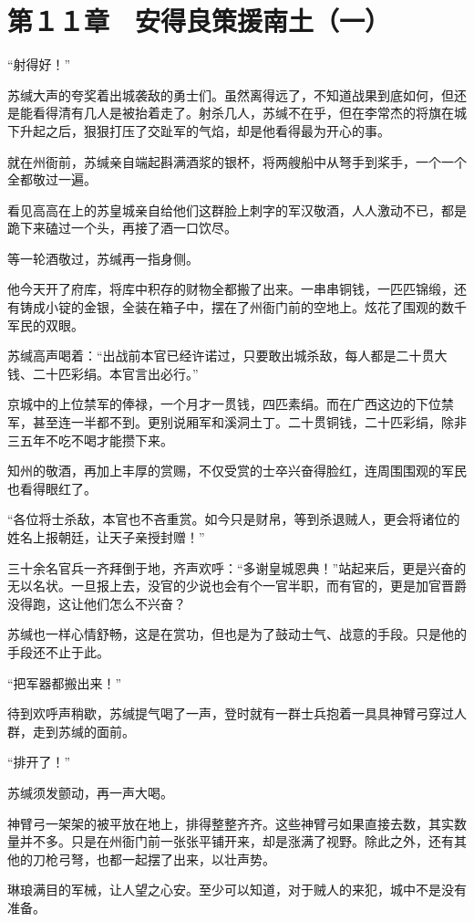 \section{第１１章　安得良策援南土（一）}

“射得好！”

苏缄大声的夸奖着出城袭敌的勇士们。虽然离得远了，不知道战果到底如何，但还是能看得清有几人是被抬着走了。射杀几人，苏缄不在乎，但在李常杰的将旗在城下升起之后，狠狠打压了交趾军的气焰，却是他看得最为开心的事。

就在州衙前，苏缄亲自端起斟满酒浆的银杯，将两艘船中从弩手到桨手，一个一个全都敬过一遍。

看见高高在上的苏皇城亲自给他们这群脸上刺字的军汉敬酒，人人激动不已，都是跪下来磕过一个头，再接了酒一口饮尽。

等一轮酒敬过，苏缄再一指身侧。

他今天开了府库，将库中积存的财物全都搬了出来。一串串铜钱，一匹匹锦缎，还有铸成小锭的金银，全装在箱子中，摆在了州衙门前的空地上。炫花了围观的数千军民的双眼。

苏缄高声喝着：“出战前本官已经许诺过，只要敢出城杀敌，每人都是二十贯大钱、二十匹彩绢。本官言出必行。”

京城中的上位禁军的俸禄，一个月才一贯钱，四匹素绢。而在广西这边的下位禁军，甚至连一半都不到。更别说厢军和溪洞土丁。二十贯铜钱，二十匹彩绢，除非三五年不吃不喝才能攒下来。

知州的敬酒，再加上丰厚的赏赐，不仅受赏的士卒兴奋得脸红，连周围围观的军民也看得眼红了。

“各位将士杀敌，本官也不吝重赏。如今只是财帛，等到杀退贼人，更会将诸位的姓名上报朝廷，让天子亲授封赠！”

三十余名官兵一齐拜倒于地，齐声欢呼：“多谢皇城恩典！”站起来后，更是兴奋的无以名状。一旦报上去，没官的少说也会有个一官半职，而有官的，更是加官晋爵没得跑，这让他们怎么不兴奋？

苏缄也一样心情舒畅，这是在赏功，但也是为了鼓动士气、战意的手段。只是他的手段还不止于此。

“把军器都搬出来！”

待到欢呼声稍歇，苏缄提气喝了一声，登时就有一群士兵抱着一具具神臂弓穿过人群，走到苏缄的面前。

“排开了！”

苏缄须发颤动，再一声大喝。

神臂弓一架架的被平放在地上，排得整整齐齐。这些神臂弓如果直接去数，其实数量并不多。只是在州衙门前一张张平铺开来，却是涨满了视野。除此之外，还有其他的刀枪弓弩，也都一起摆了出来，以壮声势。

琳琅满目的军械，让人望之心安。至少可以知道，对于贼人的来犯，城中不是没有准备。

